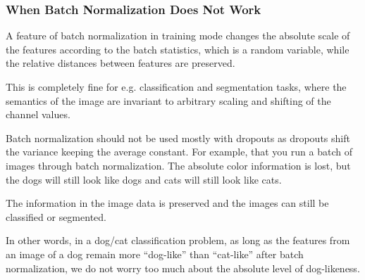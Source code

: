 	\subsubsection{When Batch Normalization Does Not Work}
	\begin{bulletedlist}
		\item A feature of batch normalization in training mode changes the absolute scale of the features according to the batch statistics, which is a random variable, while the relative distances between features are preserved.
		\item This is completely fine for e.g. classification and segmentation tasks, where the semantics of the image are invariant to arbitrary scaling and shifting of the channel values.
		\item Batch normalization should not be used mostly with dropouts as dropouts shift the variance keeping the average constant.
For example, that you run a batch of images through batch normalization.  The absolute color information is lost, but the dogs will still look like dogs and cats will still look like cats.
		\item The information in the image data is preserved and the images can still be classified or segmented.
		\item In other words, in a dog/cat classification problem, as long as the features from an image of a dog remain more ``dog-like'' than ``cat-like'' after batch normalization, we do not worry too much about the absolute level of dog-likeness.
	\end{bulletedlist}

